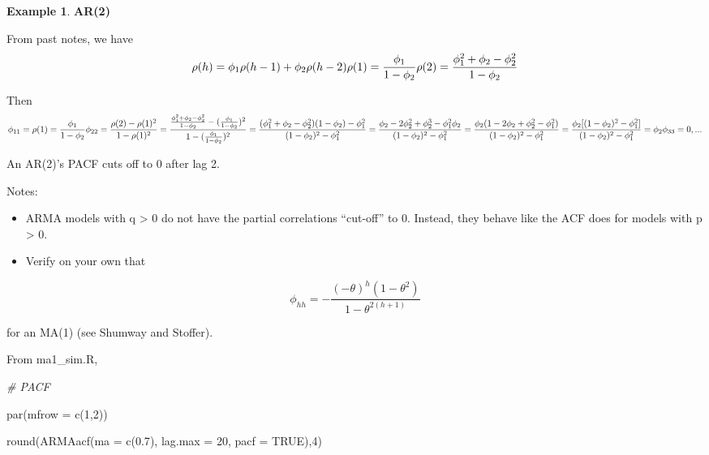 \documentclass[
]{book}
\newenvironment{Shaded}{\begin{snugshade}}{\end{snugshade}}
\newcommand{\AttributeTok}[1]{\textcolor[rgb]{0.77,0.63,0.00}{#1}}
\newcommand{\CommentTok}[1]{\textcolor[rgb]{0.56,0.35,0.01}{\textit{#1}}}
\newcommand{\ConstantTok}[1]{\textcolor[rgb]{0.00,0.00,0.00}{#1}}
\newcommand{\DecValTok}[1]{\textcolor[rgb]{0.00,0.00,0.81}{#1}}
\newcommand{\FloatTok}[1]{\textcolor[rgb]{0.00,0.00,0.81}{#1}}
\newcommand{\FunctionTok}[1]{\textcolor[rgb]{0.00,0.00,0.00}{#1}}
\newcommand{\NormalTok}[1]{#1}
\providecommand{\tightlist}{%
  \setlength{\itemsep}{0pt}\setlength{\parskip}{0pt}}
\theoremstyle{definition}
\theoremstyle{definition}
\newtheorem{example}{Example}[chapter]
\theoremstyle{definition}
\theoremstyle{definition}
\theoremstyle{remark}
\begin{document}
\begin{example}
\textbf{AR(2)}

From past notes, we have \[\rho(h)=\phi_1\rho(h-1)+\phi_2\rho(h-2)\\
\rho(1)=\frac{\phi_1}{1-\phi_2}\\
\rho(2)=\frac{\phi_1^2+\phi_2-\phi_2^2}{1-\phi_2}\]

Then \[\phi_{11}=\rho(1)=\frac{\phi_1}{1-\phi_2}\\
\phi_{22}=\frac{\rho(2)-\rho(1)^2}{1-\rho(1)^2}=\frac{\frac{\phi_1^2+\phi_2-\phi_2^2}{1-\phi_2}-(\frac{\phi_1}{1-\phi_2})^2}{1-(\frac{\phi_1}{1-\phi_2})^2}\\
=\frac{(\phi_1^2+\phi_2-\phi_2^2)(1-\phi_2)-\phi_1^2}{(1-\phi_2)^2-\phi_1^2}\\
=\frac{\phi_2-2\phi_2^2+\phi_2^3-\phi_1^2\phi_2}{(1-\phi_2)^2-\phi_1^2}\\
=\frac{\phi_2(1-2\phi_2+\phi_2^2-\phi_1^2)}{(1-\phi_2)^2-\phi_1^2}\\
=\frac{\phi_2[(1-\phi_2)^2-\phi_1^2]}{(1-\phi_2)^2-\phi_1^2}=\phi_2\\
\phi_{33}=0,...\]

An AR(2)'s PACF cuts off to 0 after lag 2.
\end{example}

Notes:

\begin{itemize}
\tightlist
\item
  ARMA models with q \textgreater{} 0 do not have the partial correlations ``cut-off'' to 0. Instead, they behave like the ACF does for models with p \textgreater{} 0.
\item
  Verify on your own that
\end{itemize}

\[\phi_{hh}=-\frac{(-\theta)^h(1-\theta^2)}{1-\theta^{2(h+1)}}\]

for an MA(1) (see Shumway and Stoffer).

From ma1\_sim.R,

\begin{Shaded}
\begin{Highlighting}[]
\CommentTok{\# PACF}

\FunctionTok{par}\NormalTok{(}\AttributeTok{mfrow =} \FunctionTok{c}\NormalTok{(}\DecValTok{1}\NormalTok{,}\DecValTok{2}\NormalTok{))}

\FunctionTok{round}\NormalTok{(}\FunctionTok{ARMAacf}\NormalTok{(}\AttributeTok{ma =} \FunctionTok{c}\NormalTok{(}\FloatTok{0.7}\NormalTok{), }\AttributeTok{lag.max =} \DecValTok{20}\NormalTok{, }\AttributeTok{pacf =} \ConstantTok{TRUE}\NormalTok{),}\DecValTok{4}\NormalTok{)}
\end{Highlighting}
\end{Shaded}
\end{document}
